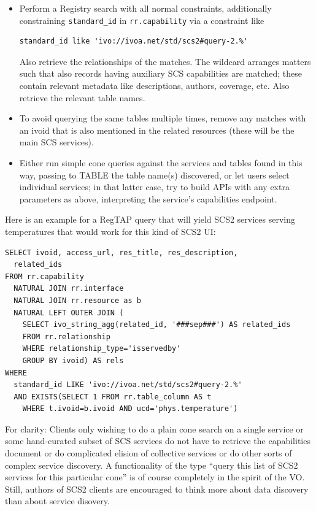 \documentclass[11pt,a4paper]{ivoa}
\begin{document}
\begin{itemize}
\item Perform a Registry search with all normal constraints, additionally
constraining \verb|standard_id| in \verb|rr.capability| via a constraint
like
\begin{lstlisting}
standard_id like 'ivo://ivoa.net/std/scs2#query-2.%'
\end{lstlisting}
Also retrieve the relationships of the matches.  The wildcard arranges
matters such that also records having auxiliary SCS capabilities are
matched; these contain
relevant metadata like descriptions, authors, coverage, etc.  Also
retrieve the relevant table names.

\item To avoid querying the same tables multiple times, remove any
matches with an ivoid that is also mentioned in the related resources
(these will be the main SCS services).

\item Either run simple cone queries against the services and tables
found in this way, passing to TABLE the table name(s) discovered, or let
users select individual services; in that latter case, try to build APIs
with any extra parameters as above, interpreting the service's
capabilities endpoint.
\end{itemize}

Here is an example for a RegTAP query that will yield SCS2 services
serving temperatures that would work for this kind of SCS2 UI:

\begin{lstlisting}
SELECT ivoid, access_url, res_title, res_description,
  related_ids
FROM rr.capability
  NATURAL JOIN rr.interface
  NATURAL JOIN rr.resource as b
  NATURAL LEFT OUTER JOIN (
    SELECT ivo_string_agg(related_id, '###sep###') AS related_ids
    FROM rr.relationship
    WHERE relationship_type='isservedby'
    GROUP BY ivoid) AS rels
WHERE
  standard_id LIKE 'ivo://ivoa.net/std/scs2#query-2.%'
  AND EXISTS(SELECT 1 FROM rr.table_column AS t
    WHERE t.ivoid=b.ivoid AND ucd='phys.temperature')
\end{lstlisting}

For clarity: Clients only wishing to do a plain cone search on a single
service or some hand-curated subset of SCS services do not have to
retrieve the capabilities document or do complicated elision of
collective services or do other sorts of complex service discovery.  A
functionality of the type ``query this list of SCS2 services for this
particular cone'' is of course completely in the spirit of the VO.
Still, authors of SCS2 clients are encouraged
to think more about data discovery
than about service disovery.
\end{document}

